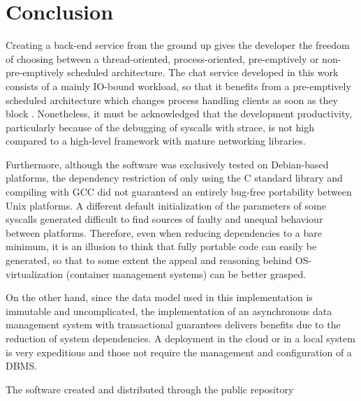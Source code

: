 \section{Conclusion}
Creating a back-end service from the ground up gives the developer the freedom of choosing between a thread-oriented, process-oriented, pre-emptively or non-pre-emptively scheduled architecture. The chat service developed in this work consists of a mainly IO-bound workload, so that it benefits from a pre-emptively scheduled architecture which changes process handling clients as soon as they block \cite{Kennedy2018}. Nonetheless, it must be acknowledged that the development productivity, particularly because of the debugging of syscalls with strace, is not high compared to a high-level framework with mature networking libraries.

Furthermore, although the software was exclusively tested on Debian-based platforms, the dependency restriction of only using the C standard library and compiling with GCC did not guaranteed an entirely bug-free portability between Unix platforms. A different default initialization of the parameters of some syscalls generated difficult to find sources of faulty and unequal behaviour between platforms. Therefore, even when reducing dependencies to a bare minimum, it is an illusion to think that fully portable code can easily be generated, so that to some extent the appeal and reasoning behind OS-virtualization (container management systems) can be better grasped.

On the other hand, since the data model used in this implementation is immutable and uncomplicated, the implementation of an asynchronous data management system with transactional guarantees delivers benefits due to the reduction of system dependencies. A deployment in the cloud or in a local system is very expeditious and those not require the management and configuration of a DBMS.

The software created and distributed through the public repository 
